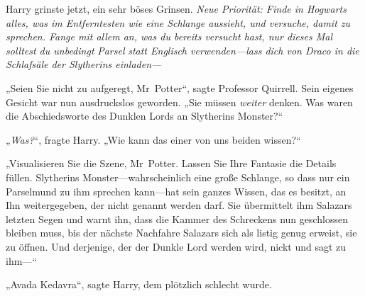 Harry grinste jetzt, ein sehr böses Grinsen. \emph{Neue Priorität: Finde in Hogwarts alles, was im Entferntesten wie eine Schlange aussieht, und versuche, damit zu sprechen. Fange mit allem an, was du bereits versucht hast, nur dieses Mal solltest du unbedingt} \emph{Parsel} \emph{statt Englisch verwenden—lass dich von Draco in die Schlafsäle der Slytherins einladen—}

„Seien Sie nicht zu aufgeregt, Mr~Potter“, sagte Professor Quirrell. Sein eigenes Gesicht war nun ausdruckslos geworden. „Sie müssen \emph{weiter} denken. Was waren die Abschiedsworte des Dunklen Lords an Slytherins Monster?“

„\emph{Was?}“, fragte Harry. „Wie kann das einer von uns beiden wissen?“

„Visualisieren Sie die Szene, Mr~Potter. Lassen Sie Ihre Fantasie die Details füllen. Slytherins Monster—wahrscheinlich eine große Schlange, so dass nur ein Parselmund zu ihm sprechen kann—hat sein ganzes Wissen, das es besitzt, an Ihn weitergegeben, der nicht genannt werden darf. Sie übermittelt ihm Salazars letzten Segen und warnt ihn, dass die Kammer des Schreckens nun geschlossen bleiben muss, bis der nächste Nachfahre Salazars sich als listig genug erweist, sie zu öffnen. Und derjenige, der der Dunkle Lord werden wird, nickt und sagt zu ihm—“

„Avada Kedavra“, sagte Harry, dem plötzlich schlecht wurde.

